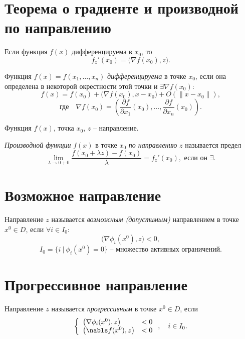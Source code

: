 \section{Теорема о градиенте и производной по направлению}

\begin{theorem}
	Если функция $f(x)$ дифференцируема в $x_0$, то
	\[
		f_{z}'(x_0) = \big(\nabla f(x_0),z\big).
	\]
\end{theorem}

\begin{definition}
	Функция $f(x) = f(x_1,\ldots,x_n)$ \emph{дифференцируема} в точке $x_0$, если она определена в некоторой окрестности этой точки и $\exists \nabla f(x_0):$
	\[
		f(x) = f(x_0) + \big(\nabla f(x_0), x - x_0\big) + O(\| x - x_0 \|),
	\]
	\[
		\text{где} \quad \nabla f(x_0) = \left(\frac{\partial f}{\partial x_1}(x_0), \ldots, \frac{\partial f}{\partial x_n}(x_0)\right).
	\]
\end{definition}

\begin{definition}
	Функция $f(x)$, точка $x_0$, $z$ -- направление.

	\emph{Производной функции} $f(x)$ в точке $x_0$ \emph{по направлению} $z$ называется предел
	\[
		\underset{\lambda \rightarrow 0 + 0}{\lim} \frac{f(x_0 + \lambda z) - f(x_0)}{\lambda} = f_z'(x_0), \text{ если он }\exists.
	\]
\end{definition}

\section{Возможное направление}

\begin{definition}
	Направление $z$ называется \emph{возможным (допустимым)} направлением в точке $x^0 \in D$, если $\forall i \in I_0:$
	\[
		\big(\nabla \phi_i(x^0),z\big) < 0,
	\]
	\[
		I_0 = \big\{i \ | \ \phi_i(x^0) = 0\big\} \text{ -- множество активных ограничений}.
	\]
\end{definition}

\newpage

\section{Прогрессивное направление}

\begin{definition}
	Направление $z$ называется \emph{прогрессивным} в точке $x^0 \in D$, если
	\[
		\left\{\begin{array}{ll}
			\big(\nabla \phi_i(x^0),z\big) & < 0 \\
			\big(\nabls f(x^0),z\big)      & < 0
		\end{array}\right., \quad i \in I_0.
	\]
\end{definition}

